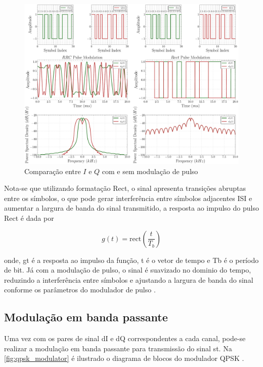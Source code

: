 \begin{figure}[H]
	\caption{Comparação entre $I$ e $Q$ com e sem modulação de pulso}\label{fig:formatter_comp}
	\includegraphics[width=\linewidth]{assets/cap2/example_formatter_comp.pdf}
\end{figure}

Nota-se que utilizando formatação \gls{Rect}, o sinal apresenta transições abruptas entre os símbolos, o que pode gerar interferência entre símbolos adjacentes \gls{ISI} e aumentar a largura de banda do sinal transmitido, a resposta ao impulso do pulso \gls{Rect} é dada por

\vspace{-1em}
\begin{equation}
    g(t) = \text{rect}\left(\frac{t}{T_b}\right)
\end{equation}

\noindent onde, \gls{gt} é a resposta ao impulso da função, \gls{t} é o vetor de tempo e \gls{Tb} é o período de bit. Já com a modulação de pulso, o sinal é suavizado no dominio do tempo, reduzindo a interferência entre símbolos e ajustando a largura de banda do sinal conforme os parâmetros do modulador de pulso \cite{cnes_services_and_message_formats_ed2_rev2_2006,10555531840,rodrigues_demodulador_2018}.

\subsection{Modulação em banda passante} 

Uma vez com os pares de sinal \gls{dI} e \gls{dQ} correspondentes a cada canal, pode-se realizar a modulação em banda passante para transmissão do sinal \gls{st}. Na \autoref{fig:qpsk_modulator} é ilustrado o diagrama de blocos do modulador \gls{QPSK} \cite{cnes_services_and_message_formats_ed2_rev2_2006}.

